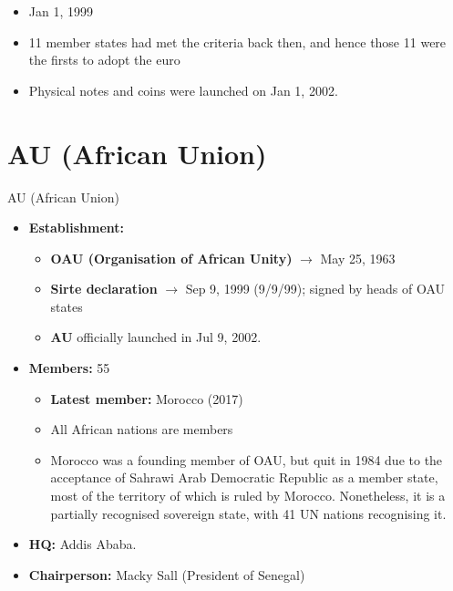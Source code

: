 \documentclass[
  10pt,
  ignorenonframetext,
  progressbar=frametitle]{beamer}
\providecommand{\tightlist}{%
  \setlength{\itemsep}{0pt}\setlength{\parskip}{0pt}}
\begin{document}
\begin{frame}[allowframebreaks]
\begin{itemize}
\begin{itemize}
    \begin{itemize}
    \tightlist
    \item
      Jan 1, 1999
    \item
      11 member states had met the criteria back then, and hence those
      11 were the firsts to adopt the euro
    \item
      Physical notes and coins were launched on Jan 1, 2002.
    \end{itemize}
  \end{itemize}
\end{itemize}
\end{frame}

\section{AU (African Union)}
\begin{frame}[allowframebreaks]
{AU (African Union)}
\protect\hypertarget{au-african-union}{}
\begin{itemize}
\tightlist
\item
  \textbf{Establishment:}

  \begin{itemize}
  \tightlist
  \item
    \textbf{OAU (Organisation of African Unity)} \(\rightarrow\) May 25,
    1963
  \item
    \textbf{Sirte declaration} \(\rightarrow\) Sep 9, 1999 (9/9/99);
    signed by heads of OAU states
  \item
    \textbf{AU} officially launched in Jul 9, 2002.
  \end{itemize}
\item
  \textbf{Members:} 55

  \begin{itemize}
  \tightlist
  \item
    \textbf{Latest member:} Morocco (2017)
  \item
    All African nations are members
  \item
    Morocco was a founding member of OAU, but quit in 1984 due to the
    acceptance of Sahrawi Arab Democratic Republic as a member state,
    most of the territory of which is ruled by Morocco. Nonetheless, it
    is a partially recognised sovereign state, with 41 UN nations
    recognising it.
  \end{itemize}
\item
  \textbf{HQ:} Addis Ababa.
\item
  \textbf{Chairperson:} Macky Sall (President of Senegal)
\end{itemize}
\end{frame}
\end{document}
